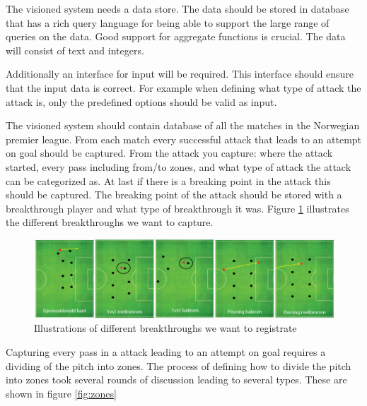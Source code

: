 The visioned system needs a data store. The data should be stored in database that has a rich query language for being able to support the large range of queries on the data. Good support for aggregate functions is crucial. The data will consist of text and integers.

Additionally an interface for input will be required. This interface should ensure that the input data is correct. For example when defining what type of attack the attack is, only the predefined options should be valid as input. 

The visioned system should contain database of all the matches in the Norwegian premier league. From each match every successful attack that leads to an attempt on goal should be captured. From the attack you capture: where the attack started, every pass including from/to zones, and what type of attack the attack can be categorized as. At last if there is a breaking point in the attack this should be captured. The breaking point of the attack should be stored with a breakthrough player and what type of breakthrough it was. Figure \ref{fig:different_break} illustrates the different breakthroughs we want to capture.

\begin{figure}[ht!]
\centering
\includegraphics[width=1\textwidth]{images/general/different_breakthroughs.png}
\caption{Illustrations of different breakthroughs we want to registrate}
\label{fig:different_break}
\end{figure}

Capturing every pass in a attack leading to an attempt on goal requires a dividing of the pitch into zones. The process of defining how to divide the pitch into zones took several rounds of discussion leading to several types. These are shown in figure \ref{fig:zones}

